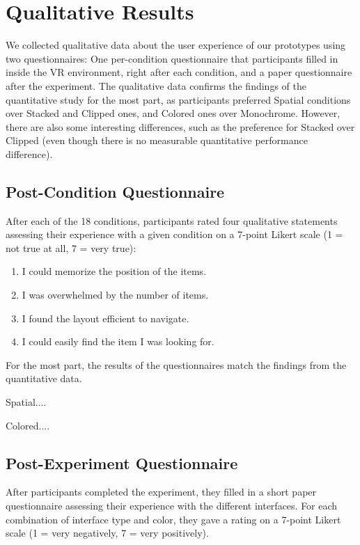 \documentclass{tufte-book} %
\begin{document}
\section{Qualitative Results}

We collected qualitative data about the user experience of our prototypes using two questionnaires: One per-condition questionnaire that participants filled in inside the VR environment, right after each condition, and a paper questionnaire after the experiment. The qualitative data confirms the findings of the quantitative study for the most part, as participants preferred Spatial conditions over Stacked and Clipped ones, and Colored ones over Monochrome. However, there are also some interesting differences, such as the preference for Stacked over Clipped (even though there is no measurable quantitative performance difference).

\subsection{Post-Condition Questionnaire}
After each of the 18 conditions, participants rated four qualitative statements assessing their experience with a given condition on a 7-point Likert scale (1 = not true at all, 7 = very true):

\begin{enumerate}[label=\arabic*. , wide=0.5em,  leftmargin=*]
  \item I could memorize the position of the items.
  \item I was overwhelmed by the number of items.
  \item I found the layout efficient to navigate.
  \item I could easily find the item I was looking for.
\end{enumerate}

For the most part, the results of the questionnaires match the findings from the quantitative data.

Spatial....

Colored....

\subsection{Post-Experiment Questionnaire}
After participants completed the experiment, they filled in a short paper questionnaire assessing their experience with the different interfaces. For each combination of interface type and color, they gave a rating on a 7-point Likert scale (1 = very negatively, 7 = very positively).
\end{document}

